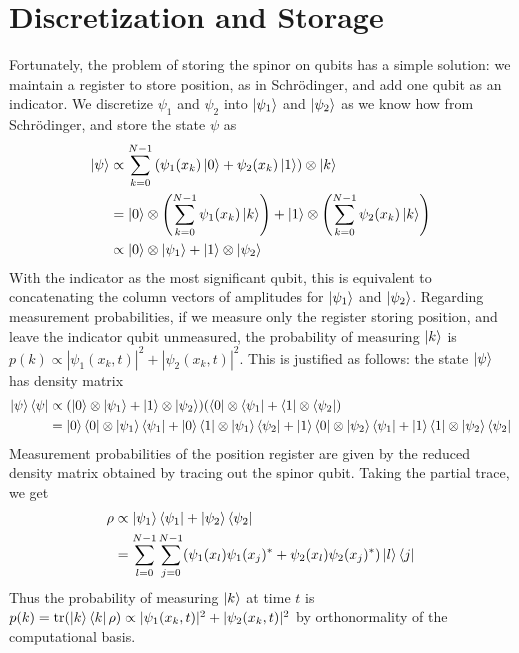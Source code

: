 \documentclass[10pt]{article}
\begin{document}
\section*{Discretization and Storage}
Fortunately, the problem of storing the spinor on qubits has a simple solution: we
maintain a register to store position, as in Schrödinger, and add one qubit as
an indicator. We discretize $\psi_1$ and $\psi_2$ into $\ket{\psi_1}$ and $\ket{\psi_2}$
as we know how from Schrödinger, and store the state $\psi$ as
\begin{align*}
    \ket{\psi} &\propto \sum_{k=0}^{N-1} \left(\psi_1(x_k)\ket{0} + \psi_2(x_k)\ket{1}\right) \otimes \ket{k} \\
               &= \ket{0} \otimes \left( \sum_{k=0}^{N-1} \psi_1(x_k) \ket{k} \right) + \ket{1} \otimes \left( \sum_{k=0}^{N-1} \psi_2(x_k) \ket{k} \right) \\
               &\propto \ket{0} \otimes \ket{\psi_1} + \ket{1} \otimes \ket{\psi_2}
\end{align*}
With the indicator as the most significant qubit, this is equivalent to concatenating the
column vectors of amplitudes for $\ket{\psi_1}$ and $\ket{\psi_2}$. Regarding measurement
probabilities, if we measure only the register storing position, and leave the indicator
qubit unmeasured, the probability of measuring $\ket{k}$ is $p(k) \propto |\psi_1(x_k, t)|^2 + |\psi_2(x_k, t)|^2$.
This is justified as follows: the state $\ket{\psi}$ has density matrix
\begin{align*}
    \ket{\psi}\bra{\psi} &\propto (\ket{0} \otimes \ket{\psi_1} + \ket{1} \otimes \ket{\psi_2})(\bra{0} \otimes \bra{\psi_1} + \bra{1}\otimes \bra{\psi_2}) \\
    &= \ket{0}\bra{0} \otimes \ket{\psi_1} \bra{\psi_1} + \ket{0}\bra{1} \otimes \ket{\psi_1} \bra{\psi_2} + \ket{1}\bra{0} \otimes \ket{\psi_2} \bra{\psi_1} + \ket{1}\bra{1} \otimes \ket{\psi_2} \bra{\psi_2}
\end{align*}
Measurement probabilities of the position register are given by the reduced density
matrix obtained by tracing out the spinor qubit. Taking the partial trace, we get
\begin{align*}
    \mathcal{\rho} &\propto \ket{\psi_1}\bra{\psi_1} + \ket{\psi_2} \bra{\psi_2} \\
                   &= \sum_{l=0}^{N-1}\sum_{j=0}^{N-1}(\psi_1(x_l)\psi_1(x_j)^* + \psi_2(x_l)\psi_2(x_j)^*) \ket{l} \bra{j}
\end{align*}
Thus the probability of measuring $\ket{k}$ at time $t$ is $p(k) = \text{tr}(\ket{k}\bra{k}\rho) 
\propto |\psi_1(x_k, t)|^2 + |\psi_2(x_k, t)|^2$ by orthonormality of the computational basis.
\end{document}
